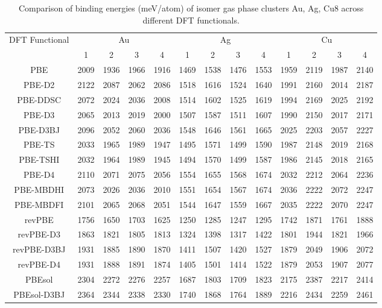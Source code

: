 \begin{table}[ht]
\centering
\caption{Comparison of binding energies (meV/atom) of isomer gas phase clusters Au, Ag, Cu8 across different DFT functionals.}
\begin{tabular}{ccccccccccccc}
\hline\hline
DFT Functional & \multicolumn{4}{c}{Au} & \multicolumn{4}{c}{Ag} & \multicolumn{4}{c}{Cu} \\ 
\cline{2-13}
 & 1 & 2 & 3 & 4 & 1 & 2 & 3 & 4 & 1 & 2 & 3 & 4 \\ \hline
PBE & 2009 & 1936 & 1966 & 1916 & 1469 & 1538 & 1476 & 1553 & 1959 & 2119 & 1987 & 2140 \\ 
PBE-D2 & 2122 & 2087 & 2062 & 2086 & 1518 & 1616 & 1524 & 1640 & 1991 & 2160 & 2014 & 2187 \\ 
PBE-DDSC & 2072 & 2024 & 2036 & 2008 & 1514 & 1602 & 1525 & 1619 & 1994 & 2169 & 2025 & 2192 \\ 
PBE-D3 & 2065 & 2013 & 2019 & 2000 & 1507 & 1587 & 1511 & 1607 & 1990 & 2150 & 2017 & 2171 \\ 
PBE-D3BJ & 2096 & 2052 & 2060 & 2036 & 1548 & 1646 & 1561 & 1665 & 2025 & 2203 & 2057 & 2227 \\ 
PBE-TS & 2033 & 1965 & 1989 & 1947 & 1495 & 1571 & 1499 & 1590 & 1987 & 2148 & 2019 & 2168 \\ 
PBE-TSHI & 2032 & 1964 & 1989 & 1945 & 1494 & 1570 & 1499 & 1587 & 1986 & 2145 & 2018 & 2165 \\ 
PBE-D4 & 2110 & 2071 & 2075 & 2056 & 1554 & 1655 & 1568 & 1674 & 2032 & 2212 & 2064 & 2236 \\ 
PBE-MBDHI & 2073 & 2026 & 2036 & 2010 & 1551 & 1654 & 1567 & 1674 & 2036 & 2222 & 2072 & 2247 \\ 
PBE-MBDFI & 2101 & 2065 & 2068 & 2051 & 1544 & 1647 & 1559 & 1667 & 2035 & 2222 & 2070 & 2247 \\ 
revPBE & 1756 & 1650 & 1703 & 1625 & 1250 & 1285 & 1247 & 1295 & 1742 & 1871 & 1761 & 1888 \\ 
revPBE-D3 & 1863 & 1821 & 1805 & 1813 & 1324 & 1398 & 1317 & 1422 & 1801 & 1944 & 1821 & 1966 \\ 
revPBE-D3BJ & 1931 & 1885 & 1890 & 1870 & 1411 & 1507 & 1420 & 1527 & 1879 & 2049 & 1906 & 2072 \\ 
revPBE-D4 & 1931 & 1888 & 1891 & 1874 & 1405 & 1501 & 1414 & 1522 & 1879 & 2053 & 1907 & 2077 \\ 
PBEsol & 2304 & 2272 & 2276 & 2257 & 1687 & 1803 & 1709 & 1823 & 2175 & 2387 & 2217 & 2414 \\ 
PBEsol-D3BJ & 2364 & 2344 & 2338 & 2330 & 1740 & 1868 & 1764 & 1889 & 2216 & 2434 & 2259 & 2461 \\ 

\end{tabular}
\end{table}
